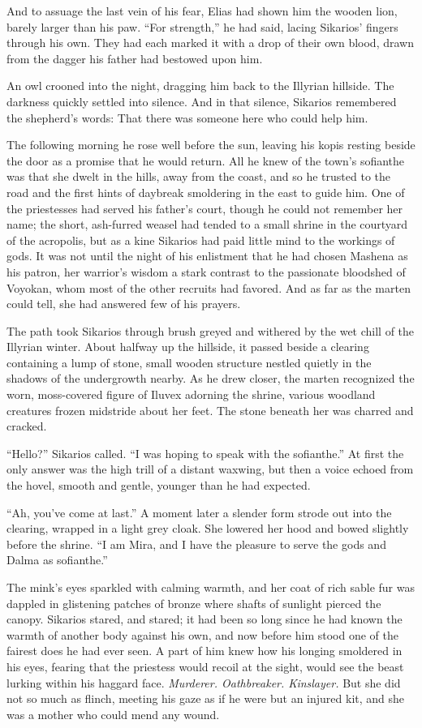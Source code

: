 And to assuage the last vein of his fear, Elias had shown him the wooden lion, barely larger than his paw. ``For strength,'' he had said, lacing Sikarios' fingers through his own. They had each marked it with a drop of their own blood, drawn from the dagger his father had bestowed upon him.

An owl crooned into the night, dragging him back to the Illyrian hillside. The darkness quickly settled into silence. And in that silence, Sikarios remembered the shepherd's words: That there was someone here who could help him.

The following morning he rose well before the sun, leaving his kopis resting beside the door as a promise that he would return. All he knew of the town's sofianthe was that she dwelt in the hills, away from the coast, and so he trusted to the road and the first hints of daybreak smoldering in the east to guide him. One of the priestesses had served his father's court, though he could not remember her name; the short, ash-furred weasel had tended to a small shrine in the courtyard of the acropolis, but as a kine Sikarios had paid little mind to the workings of gods. It was not until the night of his enlistment that he had chosen Mashena as his patron, her warrior's wisdom a stark contrast to the passionate bloodshed of Voyokan, whom most of the other recruits had favored. And as far as the marten could tell, she had answered few of his prayers.

The path took Sikarios through brush greyed and withered by the wet chill of the Illyrian winter. About halfway up the hillside, it passed beside a clearing containing a lump of stone, small wooden structure nestled quietly in the shadows of the undergrowth nearby. As he drew closer, the marten recognized the worn, moss-covered figure of Iluvex adorning the shrine, various woodland creatures frozen midstride about her feet. The stone beneath her was charred and cracked.

``Hello?'' Sikarios called. ``I was hoping to speak with the sofianthe.'' At first the only answer was the high trill of a distant waxwing, but then a voice echoed from the hovel, smooth and gentle, younger than he had expected.

``Ah, you've come at last.'' A moment later a slender form strode out into the clearing, wrapped in a light grey cloak. She lowered her hood and bowed slightly before the shrine. ``I am Mira, and I have the pleasure to serve the gods and Dalma as sofianthe.''

The mink's eyes sparkled with calming warmth, and her coat of rich sable fur was dappled in glistening patches of bronze where shafts of sunlight pierced the canopy. Sikarios stared, and stared; it had been so long since he had known the warmth of another body against his own, and now before him stood one of the fairest does he had ever seen. A part of him knew how his longing smoldered in his eyes, fearing that the priestess would recoil at the sight, would see the beast lurking within his haggard face. \emph{Murderer. Oathbreaker. Kinslayer.} But she did not so much as flinch, meeting his gaze as if he were but an injured kit, and she was a mother who could mend any wound.


